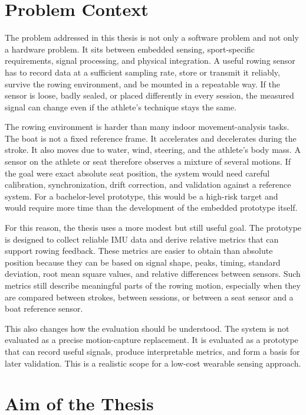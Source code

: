 \section{Problem Context}

The problem addressed in this thesis is not only a software problem and not only a hardware problem. It sits between embedded sensing, sport-specific requirements, signal processing, and physical integration. A useful rowing sensor has to record data at a sufficient sampling rate, store or transmit it reliably, survive the rowing environment, and be mounted in a repeatable way. If the sensor is loose, badly sealed, or placed differently in every session, the measured signal can change even if the athlete's technique stays the same.

The rowing environment is harder than many indoor movement-analysis tasks. The boat is not a fixed reference frame. It accelerates and decelerates during the stroke. It also moves due to water, wind, steering, and the athlete's body mass. A sensor on the athlete or seat therefore observes a mixture of several motions. If the goal were exact absolute seat position, the system would need careful calibration, synchronization, drift correction, and validation against a reference system. For a bachelor-level prototype, this would be a high-risk target and would require more time than the development of the embedded prototype itself.

For this reason, the thesis uses a more modest but still useful goal. The prototype is designed to collect reliable IMU data and derive relative metrics that can support rowing feedback. These metrics are easier to obtain than absolute position because they can be based on signal shape, peaks, timing, standard deviation, root mean square values, and relative differences between sensors. Such metrics still describe meaningful parts of the rowing motion, especially when they are compared between strokes, between sessions, or between a seat sensor and a boat reference sensor.

This also changes how the evaluation should be understood. The system is not evaluated as a precise motion-capture replacement. It is evaluated as a prototype that can record useful signals, produce interpretable metrics, and form a basis for later validation. This is a realistic scope for a low-cost wearable sensing approach.

\section{Aim of the Thesis}

